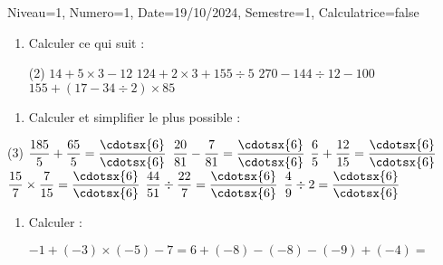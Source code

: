 \documentclass[a4paper,12pt]{article}
\begin{document}
\begin{Maquette}[DS]{Niveau=1, Numero=1, Date=19/10/2024, Semestre=1, Calculatrice=false}

\begin{exercice}
\begin{enumerate}
\item{} Calculer ce qui suit :
\begin{tasks}(2)		
\task[A=] $ 14+5\times 3-12$\newline
\anserline[3]
\task[B=] $ 124+2\times 3+155\div 5$\newline
\anserline[3]
\task[C=] $ 270-144\div 12-100$\newline
\anserline[3]
\task[D=] $ 155+(17-34\div 2)\times 85$\newline
\anserline[3]
\end{tasks}
	\end{enumerate}
\end{exercice}

\begin{exercice}
	\begin{enumerate}
\item Calculer et simplifier le plus possible :
		\end{enumerate}
\begin{tasks}(3)		
\task \(\dfrac{185}{5}+\dfrac{65}{5}=\dfrac{\cdotsx{6}}{\cdotsx{6}}\)
\task \(\dfrac{20}{81}-\dfrac{7}{81}=\dfrac{\cdotsx{6}}{\cdotsx{6}}\)
\task \(\dfrac{6}{5}+\dfrac{12}{15}=\dfrac{\cdotsx{6}}{\cdotsx{6}}\)
\task \(\dfrac{15}{7}\times \dfrac{7}{15}=\dfrac{\cdotsx{6}}{\cdotsx{6}}\)
\task \(\dfrac{44}{51}\div\dfrac{22}{7}=\dfrac{\cdotsx{6}}{\cdotsx{6}}\)
\task \(\dfrac{4}{9}\div 2=\dfrac{\cdotsx{6}}{\cdotsx{6}}\)
\end{tasks}
\end{exercice}

\begin{exercice}
\begin{enumerate}
\item Calculer :	
\begin{tasks}
\task $-1+(-3)\times (-5)-7=$\anserline[4]
\task $6+(-8)-(-8)-(-9)+(-4)=$\anserline[6]	
\end{tasks}
	\end{enumerate}
\end{exercice}




\end{Maquette}
\end{document}
